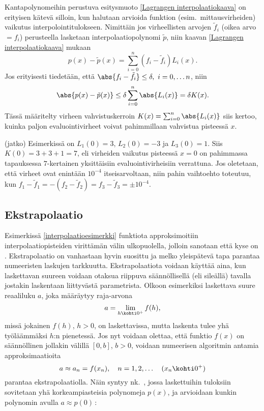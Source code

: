Kantapolynomeihin perustuva esitysmuoto \eqref{Lagrangen interpolaatiokaava} on erityisen
kätevä silloin, kun halutaan arvioida funktion   
(esim.\ mittausvirheiden) vaikutus interpolointitulokseen. Nimittäin jos virheellisten arvojen
$\tilde{f}_i$ (oikea arvo $=f_i$) perusteella lasketaan interpolaatiopolynomi $\tilde{p}$, niin
kaavan \eqref{Lagrangen interpolaatiokaava} mukaan
\[ 
p(x)-\tilde{p}(x) = \sum_{i=0}^n (f_i-\tilde{f}_i) L_i(x). 
\]
Jos erityisesti tiedetään, että $\abs{f_i-\tilde{f}_i} \le \delta,\ i=0,\ldots n$, niin
\[ 
\abs{p(x)-\tilde{p}(x)} \le \delta \sum_{i=0}^n \abs{L_i(x)} = \delta K(x). 
\]
Tässä määritelty virheen vahvistuskerroin $K(x)=\sum_{i=0}^n \abs{L_i(x)}$ siis kertoo, kuinka
paljon evaluointivirheet voivat pahimmillaan vahvistua pisteessä $x$.
\jatko \begin{Exa} (jatko) Esimerkissä on $L_1(0)=3$, $L_2(0)=-3$ ja $L_3(0)=1$. Siis
$K(0)=3+3+1=7$, eli virheiden vaikutus pisteessä $x=0$ on pahimmassa tapauksessa $7$-kertainen
yksittäisiin evaluointivirheisiin verrattuna. Jos oletetaan, että virheet ovat enintään
$10^{-4}$ itseisarvoltaan, niin pahin vaihtoehto toteutuu, kun
$f_1-\tilde{f}_1=-(f_2-\tilde{f}_2)=f_3-\tilde{f}_3=\pm 10^{-4}$. \loppu
\end{Exa}

\subsection*{Ekstrapolaatio}

Esimerkissä \ref{interpolaatioesimerkki} funktiota approksimoitiin interpolaatiopisteiden 
virittämän välin ulkopuolella, jolloin sanotaan että kyse on . 
Ekstrapolaatio on vanhastaan hyvin suosittu ja melko yleispätevä tapa parantaa numeeristen 
laskujen tarkkuutta. Ekstrapolaatiota voidaan käyttää aina, kun laskettavan suureen voidaan 
otaksua riippuva säännöllisellä (eli sileällä) tavalla jostakin laskentaan liittyvästä 
parametrista. Olkoon esimerkiksi laskettava suure reaaliluku $a$, joka määräytyy raja-arvona
\[
a=\lim_{h\kohti 0^+} f(h),
\]
missä jokainen $f(h)$, $h>0$, on laskettavissa, mutta laskenta tulee yhä työläämmäksi $h$:n 
pienetessä. Jos nyt voidaan olettaa, että funktio $f(x)$ on säännöllinen jollakin välillä 
$[0,b]$, $b>0$, voidaan numeerisen algoritmin antamia approksimaatioita
\[
a\approx a_n=f(x_n),\quad n=1,2,\ldots\quad (x_n\kohti 0^+)
\]
parantaa ekstrapolaatiolla. Näin syntyy nk.\ , jossa laskettuihin 
tuloksiin sovitetaan yhä korkeampiasteisia polynomeja $p(x)$, ja arvioidaan kunkin polynomin
avulla $a\approx p(0)$\,:

